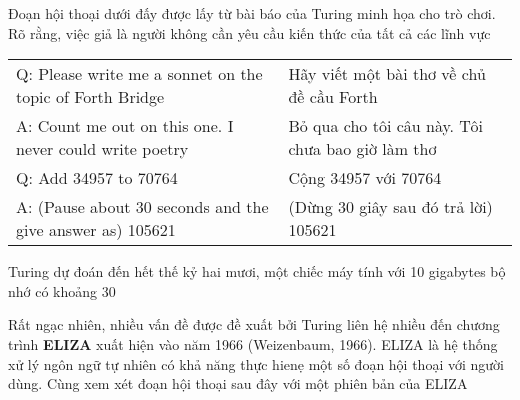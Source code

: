 Đoạn hội thoại dưới đấy được lấy từ bài báo của Turing minh họa cho trò chơi. Rõ rằng, việc giả là người không cần yêu cầu kiến thức của tất cả các lĩnh vực

\vspace{1em}
\hspace*{-6em}
\begin{tabular}{ l | l}
  Q: Please write me a sonnet on the topic of Forth Bridge  & Hãy viết một bài thơ về chủ đề cầu Forth \\
  A: Count me out on this one. I never could write poetry & Bỏ qua cho tôi câu này. Tôi chưa bao giờ làm thơ \\
  Q: Add 34957 to 70764 & Cộng 34957 với 70764\\
  A: (Pause about 30 seconds and the give answer as) 105621 & (Dừng 30 giây sau đó trả lời) 105621 \\
\end{tabular}

Turing dự đoán đến hết thế kỷ hai mươi, một chiếc máy tính với 10 gigabytes bộ nhớ có khoảng 30%

Rất ngạc nhiên, nhiều vấn đề được đề xuất bởi Turing liên hệ nhiều đến chương trình \textbf{ELIZA} xuất hiện vào năm 1966 (Weizenbaum, 1966). ELIZA là hệ thống xử lý ngôn ngữ tự nhiên có khả năng thực hienẹ một số đoạn hội thoại với người dùng. Cùng xem xét đoạn hội thoại sau đây với một phiên bản của ELIZA

